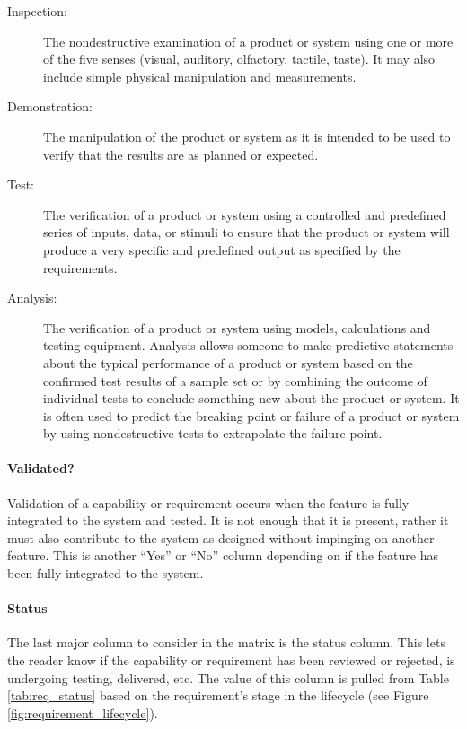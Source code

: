 {
\renewcommand{\descriptionlabel}[1]{\hspace{\parindent}\textbf{#1}}
\begin{description}
    \item[Inspection:] The nondestructive examination of a product or system using one or more of the five senses (visual, auditory, olfactory, tactile, taste). 
    It may also include simple physical manipulation and measurements.
    
    \item[Demonstration:] The manipulation of the product or system as it is intended to be used to verify that the results are as planned or expected.								
    
    \item[Test:] The verification of a product or system using a controlled and predefined series of inputs, data, or stimuli to ensure that the product or system will produce a very specific and predefined output as specified by the requirements.								
    
    \item[Analysis:] The verification of a product or system using models, calculations and testing equipment.
    Analysis allows someone to make predictive statements about the typical performance of a product or system based on the confirmed test results of a sample set or by combining the outcome of individual tests to conclude something new about the product or system.
    It is often used to predict the breaking point or failure of a product or system by using nondestructive tests to extrapolate the failure point.
\end{description}
}

\paragraph*{Validated?} Validation of a capability or requirement occurs when the feature is fully integrated to the system and tested.
It is not enough that it is present, rather it must also contribute to the system as designed without impinging on another feature.
This is another ``Yes'' or ``No'' column depending on if the feature has been fully integrated to the system.

\paragraph*{Status} The last major column to consider in the matrix is the status column.
This lets the reader know if the capability or requirement has been reviewed or rejected, is undergoing testing, delivered, etc.
The value of this column is pulled from Table \ref{tab:req_status} based on the requirement's stage in the lifecycle (see Figure \ref{fig:requirement_lifecycle}).

